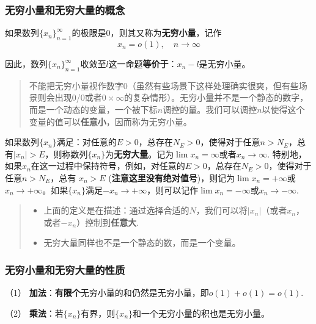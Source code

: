 \subsubsection{无穷小量和无穷大量的概念}\label{ux65e0ux7a77ux5c0fux91cfux548cux65e0ux7a77ux5927ux91cfux7684ux6982ux5ff5}

如果数列\(\{x_n\}_{n=1}^{\infty}\)的极限是0，则其又称为\textbf{无穷小量}，记作
\[
x_n = o(1),\quad n\rightarrow\infty
\]

因此，数列\(\{x_n\}_{n=1}^{\infty}\)收敛至\(l\)这一命题\textbf{等价于}：\(x_n-l\)是无穷小量。

\begin{quote}
不能把无穷小量视作数字0（虽然有些场景下这样处理确实很爽，但有些场景则会出现0/0或者\(0\times\infty\)的复杂情形）。无穷小量并不是一个静态的数字，而是一个动态的变量，一个被下标\(n\)调控的量。我们可以调控\(n\)以使得这个变量的值可以\textbf{任意小}，因而称为无穷小量。
\end{quote}

如果数列\(\{x_n\}\)满足：对任意的\(E>0\)，总存在\(N_E>0\)，使得对于任意\(n>N_E\)，总有\(\vert x_n\vert > E\)，则称数列\(\{x_n\}\)为\textbf{无穷大量}。记为\(\lim x_n=\infty\)或者\(x_n\rightarrow\infty\).
特别地，如果\(x_n\)在这一过程中保持符号，例如，对任意的\(E>0\)，总存在\(N_E>0\)，使得对于任意\(n
> N_E \)，总有 \(x_n > E\)
(\textbf{注意这里没有绝对值号})，则记为\(\lim x_n=+\infty\)或\(x_n\rightarrow +\infty\)。如果\(\{x_n\}\)满足\(-x_n\rightarrow+\infty\)，则可以记作\(\lim x_n=-\infty\)或\(x_n\rightarrow -\infty\).

\begin{quote}
\begin{itemize}
\tightlist
\item
  上面的定义是在描述：通过选择合适的\(N\)，我们可以将\(\vert x_n\vert\)（或者\(x_n\)，或者\(-x_n\)）控制到\textbf{任意大}.
\item
  无穷大量同样也不是一个静态的数，而是一个变量。
\end{itemize}
\end{quote}

\subsubsection{无穷小量和无穷大量的性质}\label{ux65e0ux7a77ux5c0fux91cfux548cux65e0ux7a77ux5927ux91cfux7684ux6027ux8d28}

（1）
\textbf{加法}：\textbf{有限个}无穷小量的和仍然是无穷小量，即\(o(1)+o(1)=o(1)\).

（2）
\textbf{乘法}：若\(\{x_n\}\)有界，则\(\{x_n\}\)和一个无穷小量的积也是无穷小量。

